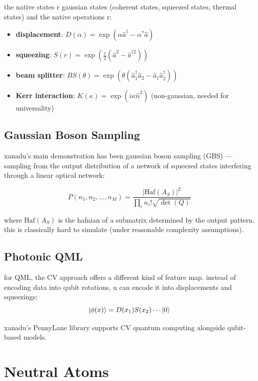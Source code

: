 \documentclass[11pt,a4paper]{article}
\theoremstyle{definition}
\theoremstyle{remark}
\begin{document}
the native states r gaussian states (coherent states, squeezed states, thermal states) and the native operations r:
\begin{itemize}[leftmargin=*]
    \item \textbf{displacement}: $D(\alpha) = \exp(\alpha \hat{a}^\dagger - \alpha^* \hat{a})$
    \item \textbf{squeezing}: $S(r) = \exp\left(\frac{r}{2}(\hat{a}^2 - \hat{a}^{\dagger 2})\right)$
    \item \textbf{beam splitter}: $BS(\theta) = \exp\left(\theta(\hat{a}_1^\dagger \hat{a}_2 - \hat{a}_1 \hat{a}_2^\dagger)\right)$
    \item \textbf{Kerr interaction}: $K(\kappa) = \exp(i\kappa \hat{n}^2)$ (non-gaussian, needed for universality)
\end{itemize}

\subsection{Gaussian Boson Sampling}

xanadu's main demonstration has been gaussian boson sampling (GBS) --- sampling from the output distribution of a network of squeezed states interfering through a linear optical network:

\[
P(n_1, n_2, \ldots, n_M) = \frac{|\text{Haf}(A_S)|^2}{\prod_i n_i! \sqrt{\det(Q)}}
\]

where $\text{Haf}(A_S)$ is the hafnian of a submatrix determined by the output pattern. this is classically hard to simulate (under reasonable complexity assumptions).

\subsection{Photonic QML}

for QML, the CV approach offers a different kind of feature map. instead of encoding data into qubit rotations, u can encode it into displacements and squeezings:
\[
\ket{\phi(x)} = D(x_1) S(x_2) \cdots \ket{0}
\]

xanadu's PennyLane library supports CV quantum computing alongside qubit-based models.

\section{Neutral Atoms}
\end{document}
